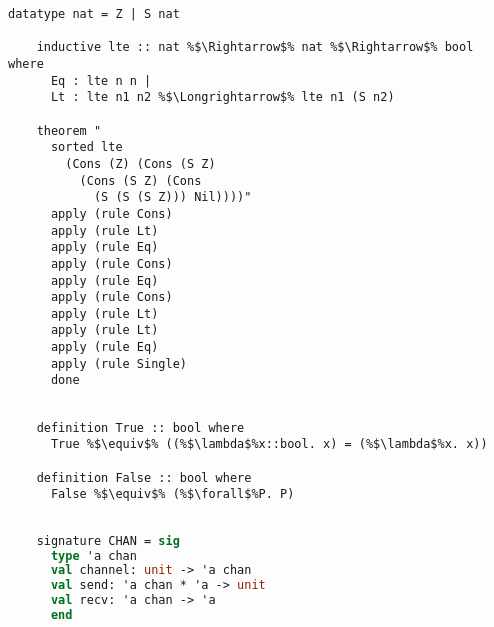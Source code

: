 \documentclass{article}
\begin{document}
    
  \begin{lstlisting}[style=codestyle1, escapechar=\%]
    datatype nat = Z | S nat 

    inductive lte :: nat %$\Rightarrow$% nat %$\Rightarrow$% bool where
      Eq : lte n n |
      Lt : lte n1 n2 %$\Longrightarrow$% lte n1 (S n2)

    theorem "
      sorted lte
        (Cons (Z) (Cons (S Z)
          (Cons (S Z) (Cons
            (S (S (S Z))) Nil))))"
      apply (rule Cons)
      apply (rule Lt)
      apply (rule Eq)
      apply (rule Cons)
      apply (rule Eq)
      apply (rule Cons)
      apply (rule Lt)
      apply (rule Lt)
      apply (rule Eq)
      apply (rule Single)
      done
    \end{lstlisting}

  \begin{lstlisting}[style=codestyle1, escapechar=\%]

    definition True :: bool where 
      True %$\equiv$% ((%$\lambda$%x::bool. x) = (%$\lambda$%x. x))

    definition False :: bool where 
      False %$\equiv$% (%$\forall$%P. P)

    \end{lstlisting}

  \begin{lstlisting}[language=ML, style=codestyle1]

    signature CHAN = sig
      type 'a chan 
      val channel: unit -> 'a chan
      val send: 'a chan * 'a -> unit
      val recv: 'a chan -> 'a
      end     
  \end{lstlisting}
\end{document}
